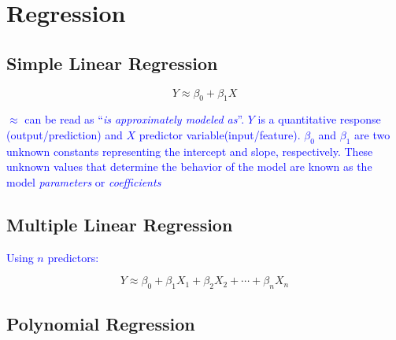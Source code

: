 \section{Regression}

\subsection{Simple Linear Regression}

\begin{equation}
{Y \approx \beta_0 + \beta_1 X}
\label{eq:slr_ex}
\end{equation}

\textcolor{blue}{$\approx$ can be read as ``\emph{is approximately modeled as}''. $Y$ is a quantitative response (output/prediction) and $X$ predictor variable(input/feature). $\beta_0$ and $\beta_1$ are two unknown constants representing the intercept and slope, respectively. These unknown values that determine the behavior of the model are known as the model \emph{parameters} or \emph{coefficients}}


\subsection{Multiple Linear Regression}

\textcolor{blue}{Using $n$ predictors:}

\begin{equation}
{Y \approx \beta_0 + \beta_1 X_1 + \beta_2 X_2 + \cdots + \beta_n X_n}
\label{eq:mlr_ex}
\end{equation}


\subsection{Polynomial Regression}